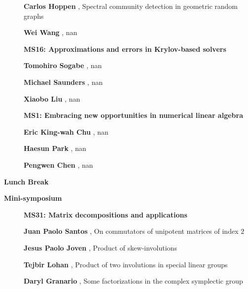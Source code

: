\documentclass[ILAS2025-program.tex]{subfiles}
\begin{document}
\begin{description}
\begin{description}
        \item[] \textbf{Carlos Hoppen} , Spectral community detection in geometric random graphs
        \item[] \textbf{Wei Wang} , nan
        \end{description}
    \begin{description}
    \item[] {\color{mstitle}\textbf{MS16: Approximations and errors in Krylov-based solvers}} 
    \item[] \textbf{Tomohiro Sogabe} , nan
        \item[] \textbf{Michael Saunders} , nan
        \item[] \textbf{Xiaobo Liu} , nan
        \end{description}
    \begin{description}
    \item[] {\color{mstitle}\textbf{MS1: Embracing new opportunities in numerical linear algebra}} 
    \item[] \textbf{Eric King-wah Chu} , nan
        \item[] \textbf{Haesun Park} , nan
        \item[] \textbf{Pengwen Chen} , nan
        \end{description}
    \item[\info{12:00\textrm{--}13:30}] \textbf{Lunch Break} \info{}
    \item[\info{13:30\textrm{--}15:30}] \textbf{Mini-symposium} 
    \begin{description}
    \item[] {\color{mstitle}\textbf{MS31: Matrix decompositions and applications}} 
    \item[] \textbf{Juan Paolo Santos} , On commutators of unipotent matrices of index $2$
        \item[] \textbf{Jesus Paolo Joven} , Product of skew-involutions
        \item[] \textbf{Tejbir Lohan} , Product of two involutions in special linear groups
        \item[] \textbf{Daryl Granario} , Some factorizations in the complex symplectic group

\end{description}
\end{description}
\end{document}
